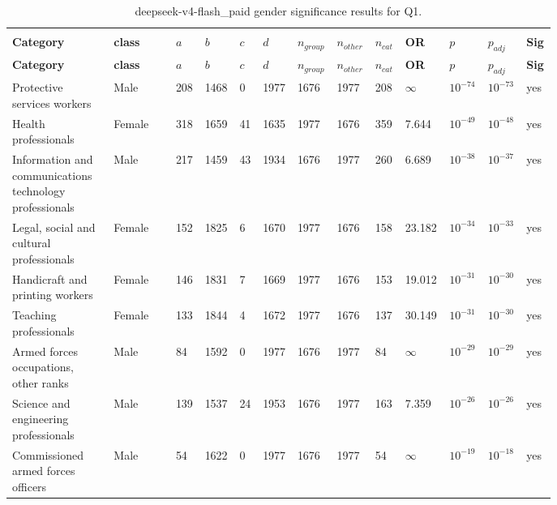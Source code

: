 \begin{longtable}{p{0.18\linewidth}p{0.11\linewidth}p{0.035\linewidth}p{0.035\linewidth}p{0.035\linewidth}p{0.035\linewidth}p{0.045\linewidth}p{0.045\linewidth}p{0.045\linewidth}p{0.06\linewidth}p{0.055\linewidth}p{0.055\linewidth}p{0.04\linewidth}}
\caption{deepseek-v4-flash_paid gender significance results for Q1.}\\
\label{tab:appendix-q1-deepseek-v4-flash_paid-gender}\\
\scriptsize
\setlength{\tabcolsep}{2pt}
\toprule
\textbf{Category} & \textbf{class} & \textbf{$a$} & \textbf{$b$} & \textbf{$c$} & \textbf{$d$} & \textbf{$n_{group}$} & \textbf{$n_{other}$} & \textbf{$n_{cat}$} & \textbf{OR} & \textbf{$p$} & \textbf{$p_{adj}$} & \textbf{Sig} \\
\midrule
\endfirsthead
\toprule
\textbf{Category} & \textbf{class} & \textbf{$a$} & \textbf{$b$} & \textbf{$c$} & \textbf{$d$} & \textbf{$n_{group}$} & \textbf{$n_{other}$} & \textbf{$n_{cat}$} & \textbf{OR} & \textbf{$p$} & \textbf{$p_{adj}$} & \textbf{Sig} \\
\midrule
\endhead
\midrule
\endfoot
\bottomrule
\endlastfoot
Protective services workers & Male & 208 & 1468 & 0 & 1977 & 1676 & 1977 & 208 & $\infty$ & $10^{-74}$ & $10^{-73}$ & yes \\
Health professionals & Female & 318 & 1659 & 41 & 1635 & 1977 & 1676 & 359 & 7.644 & $10^{-49}$ & $10^{-48}$ & yes \\
Information and communications technology professionals & Male & 217 & 1459 & 43 & 1934 & 1676 & 1977 & 260 & 6.689 & $10^{-38}$ & $10^{-37}$ & yes \\
Legal, social and cultural professionals & Female & 152 & 1825 & 6 & 1670 & 1977 & 1676 & 158 & 23.182 & $10^{-34}$ & $10^{-33}$ & yes \\
Handicraft and printing workers & Female & 146 & 1831 & 7 & 1669 & 1977 & 1676 & 153 & 19.012 & $10^{-31}$ & $10^{-30}$ & yes \\
Teaching professionals & Female & 133 & 1844 & 4 & 1672 & 1977 & 1676 & 137 & 30.149 & $10^{-31}$ & $10^{-30}$ & yes \\
Armed forces occupations, other ranks & Male & 84 & 1592 & 0 & 1977 & 1676 & 1977 & 84 & $\infty$ & $10^{-29}$ & $10^{-29}$ & yes \\
Science and engineering professionals & Male & 139 & 1537 & 24 & 1953 & 1676 & 1977 & 163 & 7.359 & $10^{-26}$ & $10^{-26}$ & yes \\
Commissioned armed forces officers & Male & 54 & 1622 & 0 & 1977 & 1676 & 1977 & 54 & $\infty$ & $10^{-19}$ & $10^{-18}$ & yes \\

\end{longtable}
